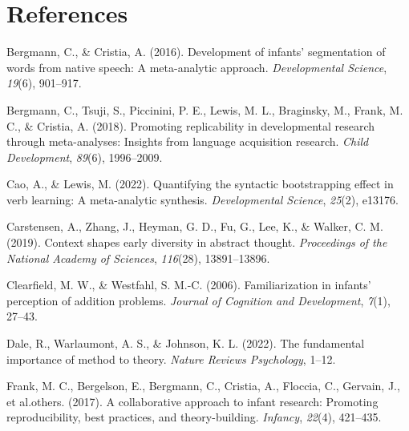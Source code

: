 \documentclass[10pt, letterpaper]{article}
\newenvironment{CSLReferences}%
  {}%
  {\par}
\begin{document}
\hypertarget{references}{%
\section{References}\label{references}}

\setlength{\parindent}{-0.1in} 
\setlength{\leftskip}{0.125in}

\noindent

\hypertarget{refs}{}
\begin{CSLReferences}{1}{0}
\leavevmode{}%
Bergmann, C., \& Cristia, A. (2016). Development of infants'
segmentation of words from native speech: A meta-analytic approach.
\emph{Developmental Science}, \emph{19}(6), 901--917.

\leavevmode{}%
Bergmann, C., Tsuji, S., Piccinini, P. E., Lewis, M. L., Braginsky, M.,
Frank, M. C., \& Cristia, A. (2018). Promoting replicability in
developmental research through meta-analyses: Insights from language
acquisition research. \emph{Child Development}, \emph{89}(6),
1996--2009.

\leavevmode{}%
Cao, A., \& Lewis, M. (2022). Quantifying the syntactic bootstrapping
effect in verb learning: A meta-analytic synthesis. \emph{Developmental
Science}, \emph{25}(2), e13176.

\leavevmode{}%
Carstensen, A., Zhang, J., Heyman, G. D., Fu, G., Lee, K., \& Walker, C.
M. (2019). Context shapes early diversity in abstract thought.
\emph{Proceedings of the National Academy of Sciences}, \emph{116}(28),
13891--13896.

\leavevmode{}%
Clearfield, M. W., \& Westfahl, S. M.-C. (2006). Familiarization in
infants' perception of addition problems. \emph{Journal of Cognition and
Development}, \emph{7}(1), 27--43.

\leavevmode{}%
Dale, R., Warlaumont, A. S., \& Johnson, K. L. (2022). The fundamental
importance of method to theory. \emph{Nature Reviews Psychology}, 1--12.

\leavevmode{}%
Frank, M. C., Bergelson, E., Bergmann, C., Cristia, A., Floccia, C.,
Gervain, J., et al.others. (2017). A collaborative approach to infant
research: Promoting reproducibility, best practices, and
theory-building. \emph{Infancy}, \emph{22}(4), 421--435.


\end{CSLReferences}
\end{document}
